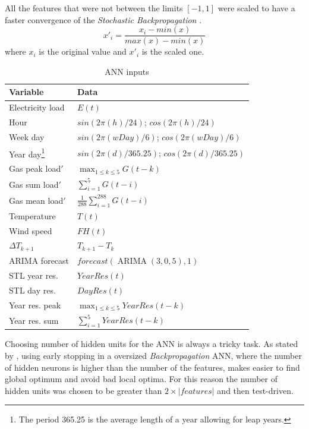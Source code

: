 \documentclass{sig-alternate-sigmod07}
\begin{document}
All the features that were not between the limits $[-1,1]$ were scaled to have a faster convergence of the \textit{Stochastic Backpropagation} \cite{lecun2012efficient}.
\begin{equation}x'_i=\frac{x_i -  min(x)}{max(x) - min(x)}\label{eq:scaled}\end{equation} where $x_i$ is the original value and $x'_i$ is the scaled one.

\begin{table}
\centering
\caption{ANN inputs}
\label{tab:ANNinputs}
\begin{tabular}{ll} \hline
Variable			& Data\\ \hline
Electricity load 		& $E(t)$ \\ 
Hour				& $sin(2\pi(h)/24)$; $cos(2\pi(h)/24)$\\
Week day			& $sin(2\pi(wDay)/6)$; $cos(2\pi(wDay)/6)$ \\
Year day\footnote{The period 365.25 is the aver­age length of a year allow­ing for leap years.}			& $sin(2\pi(d)/365.25)$; $cos(2\pi(d)/365.25)$ \\
Gas peak load$'$	& $\max_{1 \leq k \leq 5}G(t-k)$ \\
Gas sum load$'$	& $\sum_{i=1}^{5} G(t-i)$ \\
Gas mean load$'$	& $\frac{1}{288}\sum_{i=1}^{288} G(t-i)$ \\
Temperature		& $T(t)$ \\
Wind speed		& $FH(t)$ \\
$\Delta T_{k+1}$	& $T_{k+1} - T_{k}$ \\
ARIMA forecast		& $forecast(\operatorname{ARIMA} (3,0,5), 1)$ \\
STL year res.		& $YearRes(t)$ \\
STL day res.		& $DayRes(t)$ \\
Year res. peak		& $\max_{1 \leq k \leq 5} YearRes(t-k) $ \\
Year res. sum		& $\sum_{i=1}^{5} YearRes(t-k)$ \\
\hline
\end{tabular}
\end{table}

Choosing number of hidden units for the ANN is always a tricky task. As stated by \cite{lawrence1998size, sarle1995stopped}, using early stopping in a oversized \textit{Backpropagation} ANN, where the number of hidden neurons is higher than the number of the features, makes easier to find global optimum and avoid bad local optima. For this reason the number of hidden units was chosen to be greater than $2\times |features|$ and then test-driven.
\end{document}
